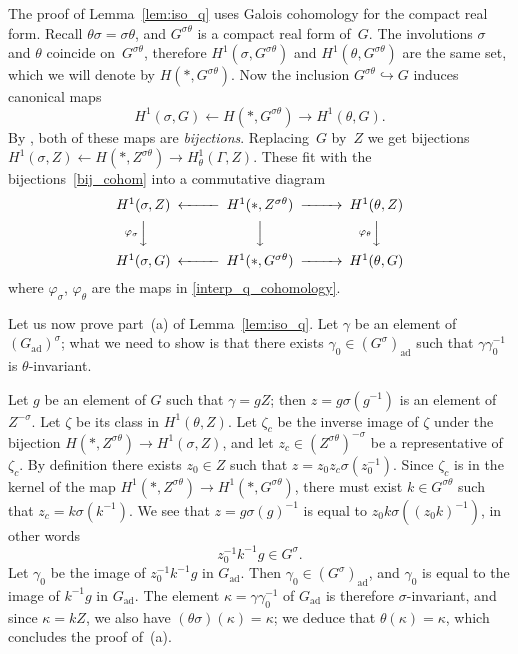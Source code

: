 \documentclass[cupthm]{CUP-JNL-JMJ}
\numberwithin{equation}{section}
\theoremstyle{cupplain}
\theoremstyle{cupdefinition}
\theoremstyle{cupremark}
\theoremstyle{cupproof}
\newcommand{\ad}{\mathrm{ad}}
\newcommand{\Gad}{G_\mathrm{ad}}
\begin{document}
The proof of Lemma~\ref{lem:iso_q} uses Galois cohomology for the compact real form.  Recall $\theta\sigma = \sigma\theta$, and $G^{\sigma\theta}$ is a compact real form of~$G$. 
The involutions $\sigma$ and $\theta$ coincide on~$G^{\sigma\theta}$,
therefore  $H^1(\sigma, G^{\sigma\theta})$ and  $H^1(\theta, G^{\sigma\theta})$ are the same set,
which we will denote by  $H(\ast, G^{\sigma\theta})$.
Now the inclusion $G^{\sigma\theta} \hookrightarrow G$ induces canonical maps 
\begin{equation} \label{bij_cohom} H^{1}(\sigma,  G) \longleftarrow H(\ast, G^{\sigma\theta}) \longrightarrow H^{1}(\theta,  G).\end{equation}
By \cite[Corollary~4.4 and Corollary 4.7]{galois}, both of these maps are \emph{bijections}.
Replacing~$G$ by~$Z$ we get bijections $H^{1}(\sigma, Z) \leftarrow H(\ast, Z^{\sigma\theta}) \rightarrow H^{1}_{\theta}(\Gamma, Z)$.
These fit with the bijections~\eqref{bij_cohom} into a commutative diagram
\[
\begin{CD}
H^{1}(\sigma, Z) @<<< H^1(\ast, Z^{\sigma\theta})@>>> H^{1}(\theta, Z)
 \\
@V{\varphi_{\sigma}}VV @VVV @V{\varphi_{\theta}}VV  \\
H^{1}(\sigma, G) @<<< H^1(\ast, G^{\sigma\theta})@>>> H^{1}(\theta,  G)
\end{CD}
\]
where $\varphi_\sigma$, $\varphi_\theta$ are the maps in \eqref{interp_q_cohomology}.

Let us now prove part~(a) of Lemma~\ref{lem:iso_q}. Let $\gamma$ be an element of $(\Gad)^\sigma$; what we need to show is that there exists $\gamma_0 \in (G^\sigma)_{\ad}$ such that $\gamma \gamma_0^{-1}$ is $\theta$-invariant. 

Let $g$ be an element of $G$ such that $\gamma = gZ$; then $z=g \sigma(g^{-1})$ is an element of~$Z^{-\sigma}$. Let $\zeta$ be its class in $H^{1}(\theta, Z)$. Let $\zeta_c$ be the inverse image of $\zeta$ under the bijection $H(\ast, Z^{\sigma\theta})\to H^{1}(\sigma, Z) $, and let $z_c\in (Z^{\sigma\theta})^{-\sigma}$ be a representative of $\zeta_c$. By definition there exists $z_0 \in Z$ such that $z = z_0 z_c \sigma(z_0^{-1})$. Since $\zeta_c$ is in the kernel of the map $H^1(\ast, Z^{\sigma\theta}) \to H^1(\ast, G^{\sigma\theta})$, there must exist  $k \in G^{\sigma\theta}$  such that $z_c = k \sigma(k^{-1})$. We see that $z = g \sigma(g)^{-1}$ is equal to $z_0 k \sigma((z_0k)^{-1})$, in other words 
\[ z_0^{-1} k^{-1} g \in G^{\sigma}.\]
Let $\gamma_0$ be the image of $z_0^{-1} k^{-1} g$ in $\Gad$. Then $\gamma_0 \in (G^{\sigma})_\ad$, and $\gamma_0$ is equal to the image of $k^{-1} g$ in $\Gad$. The element $\kappa=\gamma \gamma_0^{-1}$ of $\Gad$  is therefore $\sigma$-invariant, and since $\kappa=kZ$, we also have $(\theta\sigma)(\kappa)=\kappa$; we deduce that $\theta(\kappa) = \kappa$, which concludes the proof of~(a). 
\end{document}
